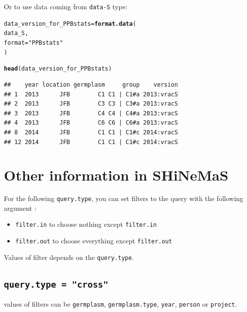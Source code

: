 \documentclass{article}\usepackage[]{graphicx}\usepackage[]{color}
\makeatletter
\newcommand{\hlstr}[1]{\textcolor[rgb]{0.192,0.494,0.8}{#1}}%
\newcommand{\hlstd}[1]{\textcolor[rgb]{0.345,0.345,0.345}{#1}}%
\newcommand{\hlkwb}[1]{\textcolor[rgb]{0.69,0.353,0.396}{#1}}%
\newcommand{\hlkwc}[1]{\textcolor[rgb]{0.333,0.667,0.333}{#1}}%
\newcommand{\hlkwd}[1]{\textcolor[rgb]{0.737,0.353,0.396}{\textbf{#1}}}%
\newenvironment{kframe}{%
 \def\at@end@of@kframe{}%
 \ifinner\ifhmode%
  \def\at@end@of@kframe{\end{minipage}}%
  \begin{minipage}{\columnwidth}%
 \fi\fi%
 \def\FrameCommand##1{\hskip\@totalleftmargin \hskip-\fboxsep
 \colorbox{shadecolor}{##1}\hskip-\fboxsep
     \hskip-\linewidth \hskip-\@totalleftmargin \hskip\columnwidth}%
 \MakeFramed {\advance\hsize-\width
   \@totalleftmargin\z@ \linewidth\hsize
   \@setminipage}}%
 {\par\unskip\endMakeFramed%
 \at@end@of@kframe}
\newenvironment{knitrout}{}{} %
\newcommand{\BD}{SHiNeMaS}
\makeatother
\begin{document}
Or to use data coming from \texttt{data-S} type:

\begin{knitrout}
\color{fgcolor}\begin{kframe}
\begin{alltt}
\hlstd{data_version_for_PPBstats} \hlkwb{=} \hlkwd{format.data}\hlstd{(}
        \hlstd{data_S,}
        \hlkwc{format} \hlstd{=} \hlstr{"PPBstats"}
\hlstd{)}
\end{alltt}


{\ttfamily\noindent\itshape{}}\begin{alltt}
\hlkwd{head}\hlstd{(data_version_for_PPBstats)}
\end{alltt}
\begin{verbatim}
##    year location germplasm     group    version
## 1  2013      JFB        C1 C1 | C1#a 2013:vracS
## 2  2013      JFB        C3 C3 | C3#a 2013:vracS
## 3  2013      JFB        C4 C4 | C4#a 2013:vracS
## 4  2013      JFB        C6 C6 | C6#a 2013:vracS
## 8  2014      JFB        C1 C1 | C1#c 2014:vracS
## 12 2014      JFB        C1 C1 | C1#c 2014:vracS
\end{verbatim}
\end{kframe}
\end{knitrout}



\newpage


\section{Other information in \BD}

For the following \texttt{query.type}, you can set filters to the query with the following argument :
\begin{itemize}
\item \texttt{filter.in} to choose nothing except \texttt{filter.in}
\item \texttt{filter.out} to choose everything except \texttt{filter.out}
\end{itemize}

Values of filter depends on the \texttt{query.type}.

\subsection{\texttt{query.type = "cross"}}
values of filters can be \texttt{germplasm}, \texttt{germplasm.type}, \texttt{year}, \texttt{person} or \texttt{project}.
\end{document}
